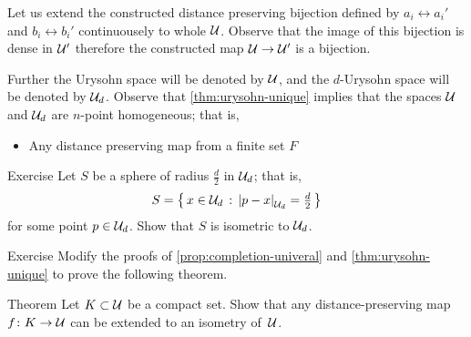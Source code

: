 Let us extend the constructed distance preserving bijection defined by $a_i\leftrightarrow a_i'$ and $b_i\leftrightarrow b_i'$ continuousely to whole $\mathcal{U}$.
Observe that the image of this bijection is dense in $\mathcal{U}'$ therefore the constructed map $\mathcal{U}\to \mathcal{U}'$ is a bijection.
\qeds

Further the Urysohn space will be denoted by $\mathcal{U}$, and the $d$-Urysohn space will be denoted by $\mathcal{U}_d$.
Observe that \ref{thm:urysohn-unique} implies that the spaces $\mathcal{U}$ and $\mathcal{U}_d$ are $n$-point homogeneous; that is, 
\begin{itemize}
 \item Any distance preserving map from a finite set $F$
\end{itemize}


\begin{thm}{Exercise}\label{ex:sphere-in-urysohn}
Let $S$ be a sphere of radius $\tfrac d2$ in $\mathcal{U}_d$;
that is, 
\[S=\set{x\in \spc{U}_d}{\dist{p}{x}{\spc{U}_d}=\tfrac d2}\]
for some point $p\in \mathcal{U}_d$.
Show that $S$ is isometric to $\mathcal{U}_d$.
\end{thm}


\begin{thm}{Exercise}
Modify the proofs of \ref{prop:completion-univeral} and \ref{thm:urysohn-unique} to prove the following theorem.
\end{thm}

\begin{thm}{Theorem}\label{thm:compact-homogeneous}
Let $K\subset \mathcal{U}$ be a compact set.
Show that any distance-preserving map $f\colon K\to\mathcal{U}$ can be extended to 
an isometry of~$\mathcal{U}$.
\end{thm}












